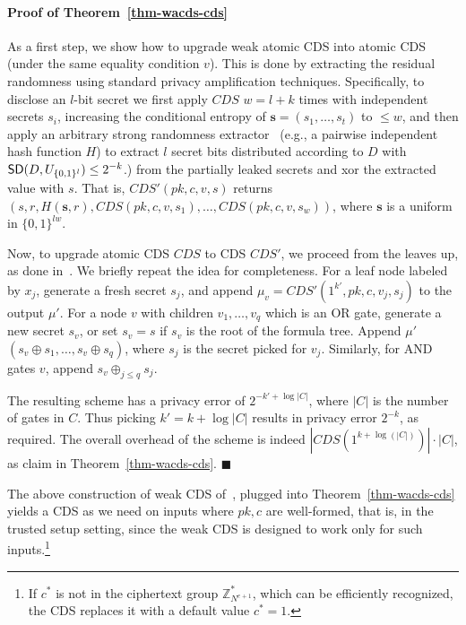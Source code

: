 \documentclass[11pt]{article}
\newcommand{\SD}{{\sf SD }}
\newcommand{\Z}{\mathbb{Z}}
\begin{document}
\paragraph{Proof of Theorem~\ref{thm-wacds-cds}}
As a first step, we show how to upgrade weak atomic CDS into atomic CDS (under the same equality  condition $v$). This is done by extracting the residual randomness using standard privacy amplification techniques. Specifically, to disclose an $l$-bit
secret we first apply $CDS$ $w=l+k$ times with independent
secrets $s_i$, increasing the conditional entropy of 
$\textbf{s}=(s_1,\ldots,s_t)$
to $\leq w$, and then apply an arbitrary strong randomness extractor~\cite{NZ}
(e.g., a pairwise independent hash function $H$\cite{BBR,ILL,BBCM}) to
extract $l$ secret bits  distributed according to $D$ with $\SD(D,U_{\{0,1\}^l})\leq 2^{-k}$.)
from the partially leaked secrets and xor the extracted value with $s$. That is, $CDS'(pk,c,v,s)$ returns $(s,r,H(\textbf{s},r),CDS(pk,c,v,s_1),\ldots,CDS(pk,c,v,s_w))$,
where $\textbf{s}$ is a uniform in $\{0,1\}^{lw}$.

Now, to upgrade atomic CDS $CDS$ to CDS $CDS'$, we proceed from the leaves up, as done in~\cite{AIR01}. We briefly repeat the idea for completeness.
For a leaf node labeled by $x_j$, generate a fresh secret $s_j$, and 
append $\mu_v=CDS'(1^{k'}, pk,c,v_j,s_j)$ to the output $\mu'$. For a node $v$ with children $v_1,\ldots,v_q$ which is an OR gate, generate a new secret $s_v$,
or set $s_v=s$ if $s_v$ is the root of the formula tree.
Append $\mu'$ $(s_v\oplus s_1,\ldots,s_v\oplus s_q)$, where $s_j$ is the secret picked for $v_j$. Similarly, for AND gates $v$, append
$s_v\oplus_{j\leq q}s_j$. 

The resulting scheme has a privacy error of $2^{-k'+\log{|C|}}$, where $|C|$ is the number of gates in $C$. Thus picking $k'=k+\log{|C|}$ results in privacy error $2^{-k}$, as required. The overall overhead of the scheme is indeed $|CDS(1^{k+\log(|C|)})|\cdot |C|$, as claim in Theorem~\ref{thm-wacds-cds}.\;\;\; $\blacksquare$


The above construction of weak CDS of~\cite{AIR01}, plugged into Theorem~\ref{thm-wacds-cds} yields a CDS as we need on inputs where $pk,c$ are well-formed, that is, in the trusted setup setting, since the weak CDS is designed to work only for such inputs.\footnote{If $c^*$ is not in the ciphertext group $\Z^*_{N^{e+1}}$, which can be efficiently recognized, the CDS replaces it with a default value $c^*=1$.}
\end{document}
